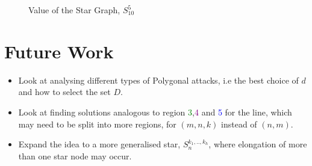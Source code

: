 \documentclass[11pt]{beamer}
\begin{document}
\begin{frame}{\insertsection}

\begin{figure}
\resizebox{0.95\linewidth}{!}{
}
\caption{Value of the Star Graph, $S_{10}^{5}$}
\end{figure}


\end{frame}

\section[]{Future Work}
\hypertarget{Future work}{}
\begin{frame}{\insertsection}

\begin{itemize}
\item Look at analysing different types of Polygonal attacks, i.e the best choice of $d$ and how to select the set $D$.
\item Look at finding solutions analogous to region \textcolor{green}{3},\textcolor{purple}{4} and \textcolor{blue}{5} for the line, which may need to be split into more regions, for $(m,n,k)$ instead of $(n,m)$.
\item Expand the idea to a more generalised star, $S_{n}^{k_{1},..,k_{h}}$, where elongation of more than one star node may occur.
\end{itemize}

\end{frame}
\end{document}
